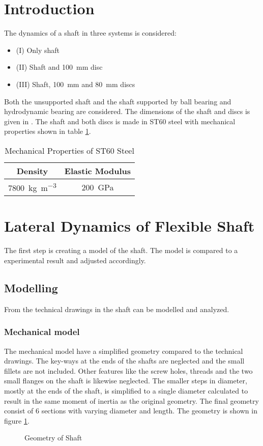 \section{Introduction}
The dynamics of a shaft in three systems is considered:
\begin{itemize}
    \item (I) Only shaft
    \item (II) Shaft and \SI{100}{\milli \meter} disc
    \item (III) Shaft, \SI{100}{\milli \meter} and \SI{80}{\milli \meter} discs
\end{itemize}
Both the unsupported shaft and the shaft supported by ball bearing and hydrodynamic bearing are considered. The dimensions of the shaft and discs is given in \cite[Appendix]{Problem}.
The shaft and both discs is made in ST60 steel with mechanical properties shown in table \ref{tab:mech_prop}.
\begin{table}[ht]
    \centering
    \caption{Mechanical Properties of ST60 Steel}
    \label{tab:mech_prop}
    \begin{tabular}{@{}cc@{}}
        \toprule
        Density                                       &   Elastic Modulus         \\ \midrule
        \SI{7800}{\kilo \gram \per \cubic \meter}             &   \SI{200}{\giga \pascal}  \\ \bottomrule
    \end{tabular}
\end{table}

\section{Lateral Dynamics of Flexible Shaft}
The first step is creating a model of the shaft. The model is compared to a experimental result and adjusted accordingly.

\subsection{Modelling}
From the technical drawings in \cite[Appendix]{Problem} the shaft can be modelled and analyzed.

\subsubsection{Mechanical model}
The mechanical model have a simplified geometry compared to the technical drawings. The key-ways at the ends of the shafts are neglected and the small fillets are not included. Other features like the screw holes, threads and the two small flanges on the shaft is likewise neglected.
The smaller steps in diameter, mostly at the ends of the shaft, is simplified to a single diameter calculated to result in the same moment of inertia as the original geometry.
The final geometry consist of 6 sections with varying diameter and length. The geometry is shown in figure \ref{fig:shaft_geometry}.
\begin{figure}[ht]
    \centering
    
    \caption{Geometry of Shaft}
    \label{fig:shaft_geometry}
\end{figure}


